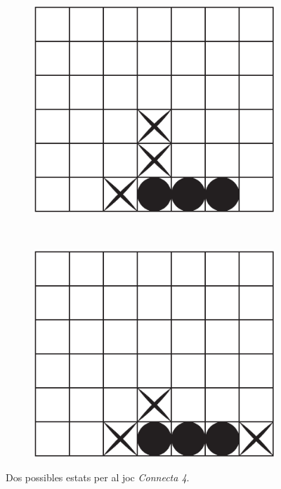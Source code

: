 \documentclass[12pt,a4paper]{article}
\begin{document}
\begin{figure}[h]
\centering
\begin{subfigure}[b]{0.4\textwidth}
\includegraphics[width=\textwidth]{connect4_example.pdf}
\end{subfigure}
~
\begin{subfigure}[b]{0.4\textwidth}
\includegraphics[width=\textwidth]{connect4_example2.pdf}
\end{subfigure}
\caption{Dos possibles estats per al joc \emph{Connecta 4}.}
\label{fig:connect4_example}
\end{figure}
\end{document}
